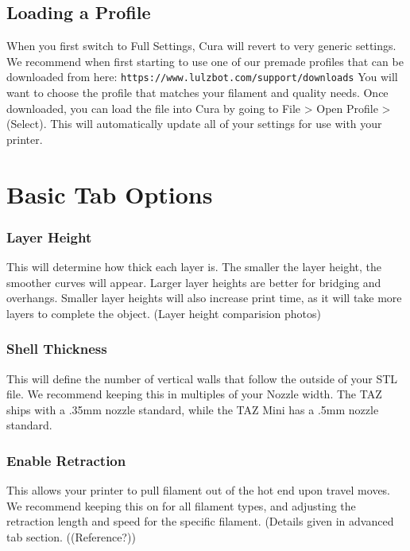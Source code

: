 \subsection{Loading a Profile}

When you first switch to Full Settings, Cura will revert to very generic settings. We recommend when first starting to use one of our premade profiles that can be downloaded from here: \texttt{https://www.lulzbot.com/support/downloads} You will want to choose the profile that matches your filament and quality needs. Once downloaded, you can load the file into Cura by going to File > Open Profile > (Select). This will automatically update all of your settings for use with your printer.

\section{Basic Tab Options}

\subsubsection{Layer Height}

This will determine how thick each layer is. The smaller the layer height, the smoother curves will appear. Larger layer heights are better for bridging and overhangs. Smaller layer heights will also increase print time, as it will take more layers to complete the object. (Layer height comparision photos)

\subsubsection{Shell Thickness}

This will define the number of vertical walls that follow the outside of your STL file. We recommend keeping this in multiples of your Nozzle width. The TAZ ships with a .35mm nozzle standard, while the TAZ Mini has a .5mm nozzle standard.

\subsubsection{Enable Retraction}

This allows your printer to pull filament out of the hot end upon travel moves. We recommend keeping this on for all filament types, and adjusting the retraction length and speed for the specific filament. (Details given in advanced tab section. ((Reference?))

